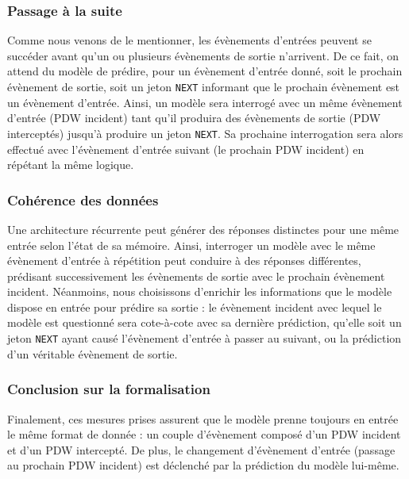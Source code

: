 \subsubsection{Passage à la suite}
Comme nous venons de le mentionner, les évènements d'entrées peuvent se succéder avant qu'un ou plusieurs évènements de sortie n'arrivent. De ce fait, on attend du modèle de prédire, pour un évènement d'entrée donné, soit le prochain évènement de sortie, soit un jeton \texttt{NEXT} informant que le prochain évènement est un évènement d'entrée. Ainsi, un modèle sera interrogé avec un même évènement d'entrée (PDW incident) tant qu'il produira des évènements de sortie (PDW interceptés) jusqu'à produire un jeton \texttt{NEXT}. Sa prochaine interrogation sera alors effectué avec l'évènement d'entrée suivant (le prochain PDW incident) en répétant la même logique.

\subsubsection{Cohérence des données}
Une architecture récurrente peut générer des réponses distinctes pour une même entrée selon l'état de sa mémoire. Ainsi, interroger un modèle avec le même évènement d'entrée à répétition peut conduire à des réponses différentes, prédisant successivement les évènements de sortie avec le prochain évènement incident. Néanmoins, nous choisissons d'enrichir les informations que le modèle dispose en entrée pour prédire sa sortie : le évènement incident avec lequel le modèle est questionné sera cote-à-cote avec sa dernière prédiction, qu'elle soit un jeton \texttt{NEXT} ayant causé l'évènement d'entrée à passer au suivant, ou la prédiction d'un véritable évènement de sortie. 

\subsubsection{Conclusion sur la formalisation}
Finalement, ces mesures prises assurent que le modèle prenne toujours en entrée le même format de donnée : un couple d'évènement composé d'un PDW incident et d'un PDW intercepté. De plus, le changement d'évènement d'entrée (passage au prochain PDW incident) est déclenché par la prédiction du modèle lui-même.


